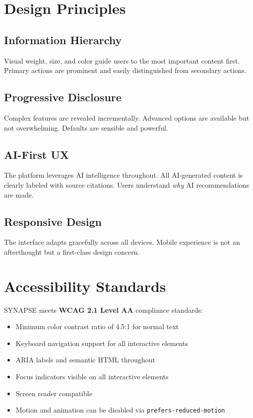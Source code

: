\documentclass{report}
\begin{document}
\section{Design Principles}

\subsection{Information Hierarchy}
Visual weight, size, and color guide users to the most important content first. Primary actions are prominent and easily distinguished from secondary actions.

\subsection{Progressive Disclosure}
Complex features are revealed incrementally. Advanced options are available but not overwhelming. Defaults are sensible and powerful.

\subsection{AI-First UX}
The platform leverages AI intelligence throughout. All AI-generated content is clearly labeled with source citations. Users understand \textit{why} AI recommendations are made.

\subsection{Responsive Design}
The interface adapts gracefully across all devices. Mobile experience is not an afterthought but a first-class design concern.

\section{Accessibility Standards}

SYNAPSE meets \textbf{WCAG 2.1 Level AA} compliance standards:

\begin{itemize}
    \item Minimum color contrast ratio of 4.5:1 for normal text
    \item Keyboard navigation support for all interactive elements
    \item ARIA labels and semantic HTML throughout
    \item Focus indicators visible on all interactive elements
    \item Screen reader compatible
    \item Motion and animation can be disabled via \texttt{prefers-reduced-motion}
\end{itemize}
\end{document}
